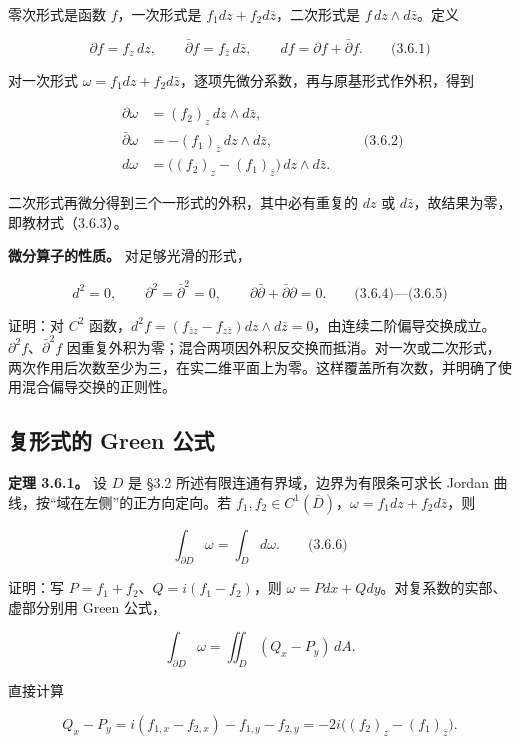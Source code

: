 \documentclass[11pt,a4paper]{article}
\begin{document}
零次形式是函数 \(f\)，一次形式是 \(f_1dz+f_2d\bar z\)，二次形式是
\(f\,dz\wedge d\bar z\)。定义

\[
\partial f=f_z\,dz,
\qquad\bar\partial f=f_{\bar z}\,d\bar z,
\qquad df=\partial f+\bar\partial f.
\qquad\text{(3.6.1)}
\]

对一次形式
\(\omega=f_1dz+f_2d\bar z\)，逐项先微分系数，再与原基形式作外积，得到

\[
\begin{aligned}
\partial\omega&=(f_2)_z\,dz\wedge d\bar z,\\
\bar\partial\omega&=-(f_1)_{\bar z}\,dz\wedge d\bar z,\\
d\omega&=\bigl((f_2)_z-(f_1)_{\bar z}\bigr)\,dz\wedge d\bar z.
\end{aligned}
\qquad\text{(3.6.2)}
\]

二次形式再微分得到三个一形式的外积，其中必有重复的 \(dz\) 或
\(d\bar z\)，故结果为零，即教材式（3.6.3）。

\textbf{微分算子的性质。} 对足够光滑的形式，

\[
d^2=0,\qquad\partial^2=\bar\partial^2=0,
\qquad\partial\bar\partial+\bar\partial\partial=0.
\qquad\text{(3.6.4)—(3.6.5)}
\]

证明：对 \(C^2\)
函数，\(d^2f=(f_{\bar z z}-f_{z\bar z})dz\wedge d\bar z=0\)，由连续二阶偏导交换成立。\(\partial^2f\)、\(\bar\partial^2f\)
因重复外积为零；混合两项因外积反交换而抵消。对一次或二次形式，两次作用后次数至少为三，在实二维平面上为零。这样覆盖所有次数，并明确了使用混合偏导交换的正则性。

\subsection{复形式的 Green
公式}\label{ch03-s6-ux590dux5f62ux5f0fux7684-green-ux516cux5f0f}

\textbf{定理 3.6.1。} 设 \(D\) 是 §3.2
所述有限连通有界域，边界为有限条可求长 Jordan
曲线，按``域在左侧''的正方向定向。若
\(f_1,f_2\in C^1(\overline D)\)，\(\omega=f_1dz+f_2d\bar z\)，则

\[
\int_{\partial D}\omega=\int_Dd\omega.
\qquad\text{(3.6.6)}
\]

证明：写 \(P=f_1+f_2\)、\(Q=i(f_1-f_2)\)，则
\(\omega=Pdx+Qdy\)。对复系数的实部、虚部分别用 Green 公式，

\[
\int_{\partial D}\omega
=\iint_D(Q_x-P_y)\,dA.
\]

直接计算

\[
Q_x-P_y=i(f_{1,x}-f_{2,x})-f_{1,y}-f_{2,y}
=-2i\bigl((f_2)_z-(f_1)_{\bar z}\bigr).
\]
\end{document}
